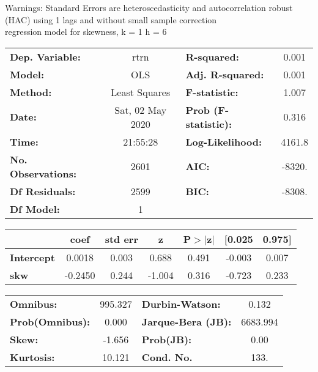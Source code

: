 Warnings: \newline
 [1] Standard Errors are heteroscedasticity and autocorrelation robust (HAC) using 1 lags and without small sample correction\\ 

regression model for skewness, k = 1 h = 6\begin{center}
\begin{tabular}{lclc}
\toprule
\textbf{Dep. Variable:}    &       rtrn       & \textbf{  R-squared:         } &     0.001   \\
\textbf{Model:}            &       OLS        & \textbf{  Adj. R-squared:    } &     0.001   \\
\textbf{Method:}           &  Least Squares   & \textbf{  F-statistic:       } &     1.007   \\
\textbf{Date:}             & Sat, 02 May 2020 & \textbf{  Prob (F-statistic):} &    0.316    \\
\textbf{Time:}             &     21:55:28     & \textbf{  Log-Likelihood:    } &    4161.8   \\
\textbf{No. Observations:} &        2601      & \textbf{  AIC:               } &    -8320.   \\
\textbf{Df Residuals:}     &        2599      & \textbf{  BIC:               } &    -8308.   \\
\textbf{Df Model:}         &           1      & \textbf{                     } &             \\
\bottomrule
\end{tabular}
\begin{tabular}{lcccccc}
                   & \textbf{coef} & \textbf{std err} & \textbf{z} & \textbf{P$> |$z$|$} & \textbf{[0.025} & \textbf{0.975]}  \\
\midrule
\textbf{Intercept} &       0.0018  &        0.003     &     0.688  &         0.491        &       -0.003    &        0.007     \\
\textbf{skw}       &      -0.2450  &        0.244     &    -1.004  &         0.316        &       -0.723    &        0.233     \\
\bottomrule
\end{tabular}
\begin{tabular}{lclc}
\textbf{Omnibus:}       & 995.327 & \textbf{  Durbin-Watson:     } &    0.132  \\
\textbf{Prob(Omnibus):} &   0.000 & \textbf{  Jarque-Bera (JB):  } & 6683.994  \\
\textbf{Skew:}          &  -1.656 & \textbf{  Prob(JB):          } &     0.00  \\
\textbf{Kurtosis:}      &  10.121 & \textbf{  Cond. No.          } &     133.  \\
\bottomrule
\end{tabular}
\end{center}


